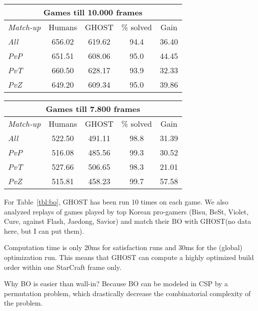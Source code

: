 \documentclass[journal]{IEEEtran}
\newcommand{\csp}{\textsc{CSP}\xspace}
\newcommand{\ghost}{\textsc{GHOST}\xspace}
\begin{document}
\begin{table*}[tba]
  \label{tbl:bo}
  \centering
  \caption{Average makespan of Humans and \ghost build orders in StarCraft time over 3647
    games.}
  \begin{tabular}{|l|c|c|c|c|} 
    \hline
    \multicolumn{5}{|c|}{ Games till 10.000 frames} \\ 
    \hline
    {\em Match-up} & Humans & \ghost & \% solved &
    Gain \\ 
    \hline
    {\em All} & 656.02 & 619.62 & 94.4 & 36.40\\
    {\em PvP} & 651.51 & 608.06 & 95.0 & 44.45\\
    {\em PvT} & 660.50 & 628.17 & 93.9 & 32.33\\
    {\em PvZ} & 649.20 & 609.34 & 95.0 & 39.86\\
    \hline
  \end{tabular}
  \hfill  
  \begin{tabular}{|l|c|c|c|c|} 
    \hline
    \multicolumn{5}{|c|}{ Games till 7.800 frames} \\ 
    \hline
    {\em Match-up} & Humans & \ghost & \% solved &
    Gain \\ 
    \hline
    {\em All} & 522.50 & 491.11 & 98.8 & 31.39\\
    {\em PvP} & 516.08 & 485.56 & 99.3 & 30.52\\
    {\em PvT} & 527.66 & 506.65 & 98.3 & 21.01\\
    {\em PvZ} & 515.81 & 458.23 & 99.7 & 57.58\\ 
    \hline
  \end{tabular}  
\end{table*}

For Table~\ref{tbl:bo}, \ghost has been run 10 times on each game. We also analyzed replays of games played by top Korean pro-gamers (Bisu, BeSt, Violet, Cure, against Flash, Jaedong, Savior) and match their BO with \ghost (no data here, but I can put them). 

Computation time is only 20ms for satisfaction runs and 30ms for the (global) optimization run. This means that \ghost can compute a highly optimized build order within one StarCraft frame only.

Why BO is easier than wall-in? Because BO can be modeled in \csp by a permutation problem, which drastically decrease the combinatorial complexity of the problem.
\end{document}
